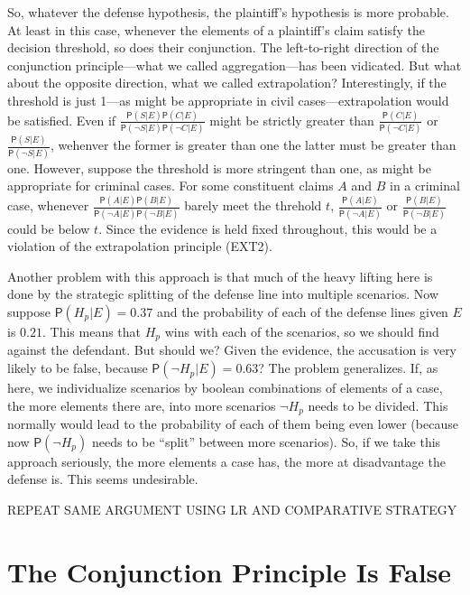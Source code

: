 \documentclass[10pt,dvipsnames,enabledeprecatedfontcommands]{scrartcl}
\newcommand{\n}{\neg}
\newcommand{\pr}[1]{\mathsf{P}(#1)}
\begin{document}
\noindent So, whatever the defense hypothesis, the plaintiff's
hypothesis is more probable. At least in this case, whenever the
elements of a plaintiff's claim satisfy the decision threshold, so does
their conjunction. The left-to-right direction of the conjunction
principle---what we called aggregation---has been vidicated. But what
about the opposite direction, what we called extrapolation?
Interestingly, if the threshold is just 1---as might be appropriate in
civil cases---extrapolation would be satisfied. Even if
\(\frac{\pr{S\vert E}\pr{C\vert E}}{\pr{\n S \vert E}\pr{\n C \vert E}}\)
might be strictly greater than
\(\frac{\pr{C\vert E}}{\pr{\n C \vert E}}\) or
\(\frac{\pr{S\vert E}}{\pr{\n S \vert E}}\), wehenver the former is
greater than one the latter must be greater than one. However, suppose
the threshold is more stringent than one, as might be appropriate for
criminal cases. For some constituent claims \(A\) and \(B\) in a
criminal case, whenever
\(\frac{\pr{A\vert E}\pr{B\vert E}}{\pr{\n A \vert E}\pr{\n B \vert E}}\)
barely meet the threhold \(t\),
\(\frac{\pr{A\vert E}}{\pr{\n A \vert E}}\) or
\(\frac{\pr{B\vert E}}{\pr{\n B \vert E}}\) could be below \(t\). Since
the evidence is held fixed throughout, this would be a violation of the
extrapolation principle (EXT2).

Another problem with this approach is that much of the heavy lifting
here is done by the strategic splitting of the defense line into
multiple scenarios. Now suppose \(\pr{H_p\vert E}=0.37\) and the
probability of each of the defense lines given \(E\) is \(0.21\). This
means that \(H_p\) wins with each of the scenarios, so we should find
against the defendant. But should we? Given the evidence, the accusation
is very likely to be false, because \(\pr{\n H_p \vert E}=0.63\)? The
problem generalizes. If, as here, we individualize scenarios by boolean
combinations of elements of a case, the more elements there are, into
more scenarios \(\n H_p\) needs to be divided. This normally would lead
to the probability of each of them being even lower (because now
\(\pr{\n H_p}\) needs to be ``split'' between more scenarios). So, if we
take this approach seriously, the more elements a case has, the more at
disadvantage the defense is. This seems undesirable.

REPEAT SAME ARGUMENT USING LR AND COMPARATIVE STRATEGY

\section{The Conjunction Principle Is
False}\label{the-conjunction-principle-is-false}
\end{document}
